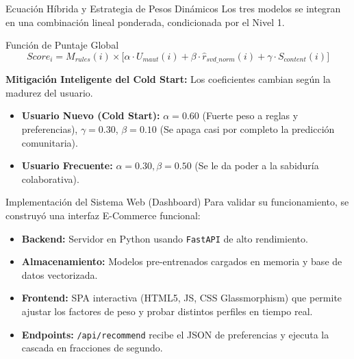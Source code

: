 \documentclass[aspectratio=169]{beamer}
\begin{document}
\begin{frame}{Ecuación Híbrida y Estrategia de Pesos Dinámicos}
    Los tres modelos se integran en una combinación lineal ponderada, condicionada por el Nivel 1.
    
    \begin{block}{Función de Puntaje Global}
    \begin{equation}
        Score_i = M_{rules}(i) \times \Big[ \alpha \cdot U_{maut}(i) + \beta \cdot \hat{r}_{svd\_norm}(i) + \gamma \cdot S_{content}(i) \Big]
    \end{equation}
    \end{block}
    
    \vspace{0.2cm}
    \textbf{Mitigación Inteligente del Cold Start:}
    Los coeficientes cambian según la madurez del usuario.
    \begin{itemize}
        \item \textbf{Usuario Nuevo (Cold Start):} $\alpha = 0.60$ (Fuerte peso a reglas y preferencias), $\gamma = 0.30$, $\beta = 0.10$ (Se apaga casi por completo la predicción comunitaria).
        \item \textbf{Usuario Frecuente:} $\alpha = 0.30, \beta = 0.50$ (Se le da poder a la sabiduría colaborativa).
    \end{itemize}
\end{frame}

\begin{frame}{Implementación del Sistema Web (Dashboard)}
    Para validar su funcionamiento, se construyó una interfaz E-Commerce funcional:
    
    \begin{itemize}
        \item \textbf{Backend:} Servidor en Python usando \texttt{FastAPI} de alto rendimiento.
        \item \textbf{Almacenamiento:} Modelos pre-entrenados cargados en memoria y base de datos vectorizada.
        \item \textbf{Frontend:} SPA interactiva (HTML5, JS, CSS Glassmorphism) que permite ajustar los factores de peso y probar distintos perfiles en tiempo real.
        \item \textbf{Endpoints:} \texttt{/api/recommend} recibe el JSON de preferencias y ejecuta la cascada en fracciones de segundo.
    \end{itemize}
\end{frame}
\end{document}
